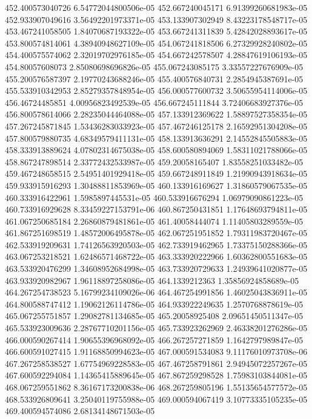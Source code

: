 {452.400573040726 6.54772044800506e-05
452.667240045171 6.91399260681983e-05
452.933907049616 3.56492201973371e-05
453.133907302949 8.43223178548717e-05
453.467241058505 1.84070687193322e-05
453.667241311839 5.42842028893617e-05
453.800574814061 4.38940948627109e-05
454.067241818506 6.27329928240802e-05
454.400575574062 2.32019702976185e-05
454.667242578507 4.28847619106193e-05
454.80057608073 2.85080698696826e-05
455.067243085175 3.33557227676909e-05
455.200576587397 2.19770243688246e-05
455.400576840731 2.2854945387691e-05
455.533910342953 2.85279357848954e-05
456.000577600732 3.50655954114006e-05
456.46724485851 4.00956823492539e-05
456.667245111844 3.72406683927376e-05
456.800578614066 2.28235044464088e-05
457.133912369622 1.58897527358354e-05
457.267245871845 1.53436283033923e-05
457.467246125178 2.16592951304208e-05
457.800579880735 4.68349579411131e-05
458.133913636291 2.14552845505883e-05
458.333913889624 4.07802314675038e-05
458.600580894069 1.58311021788066e-05
458.867247898514 2.33772432533987e-05
459.20058165407 1.83558251033482e-05
459.467248658515 2.54951401929418e-05
459.667248911849 1.21990943918634e-05
459.933915916293 1.30488811853969e-05
460.133916169627 1.31860579067535e-05
460.333916422961 1.5985897445531e-05
460.533916676294 1.06979090861223e-05
460.733916929628 8.33459227153791e-06
460.867250431851 1.17648693794811e-05
461.067250685184 2.26860879481861e-05
461.40058444074 1.11405803289559e-05
461.867251698519 1.48572006495878e-05
462.067251951852 1.79311983720467e-05
462.533919209631 1.74126563920503e-05
462.733919462965 1.73375150288366e-05
463.067253218521 1.62486571468722e-05
463.333920222966 1.60362800551683e-05
463.533920476299 1.34608952684998e-05
463.733920729633 1.24939641020877e-05
463.933920982967 1.96118897258086e-05
464.1339212363 1.35856924858689e-05
464.267254738523 5.16799234109026e-06
464.467254991856 1.46025043836911e-05
464.800588747412 1.19062126114786e-05
464.933922249635 1.2570768878619e-05
465.067255751857 1.29082781134685e-05
465.20058925408 2.09651450511347e-05
465.533923009636 2.28767710201156e-05
465.733923262969 2.46338201276286e-05
466.000590267414 1.90655396968092e-05
466.267257271859 1.1642797989847e-05
466.600591027415 1.91168850994623e-05
467.000591534083 9.11176010973708e-06
467.267258538527 1.67754969228583e-05
467.467258791861 2.94945072257267e-05
467.600592294084 1.14365415889645e-05
467.867259298528 1.75983103844081e-05
468.067259551862 8.36167173200838e-06
468.267259805196 1.55135654577572e-05
468.533926809641 3.25040119755988e-05
469.000594067419 3.10773335105235e-05
469.400594574086 2.68134148671503e-05
}
